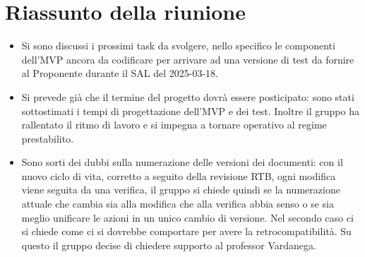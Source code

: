 \section{Riassunto della riunione}

\begin{itemize}
    \item Si sono discussi i prossimi task da svolgere, nello specifico le componenti dell'MVP ancora da codificare per arrivare ad una versione di test da fornire al Proponente durante il SAL del 2025-03-18.
    \item Si prevede già che il termine del progetto dovrà essere posticipato: sono stati sottostimati i tempi di progettazione dell'MVP e dei test. Inoltre il gruppo ha rallentato il ritmo di lavoro e si impegna a tornare operativo al regime prestabilito.
    
    \item Sono sorti dei dubbi sulla numerazione delle versioni dei documenti: con il nuovo ciclo di vita, corretto a seguito della revisione RTB, ogni modifica viene seguita da una verifica, il gruppo si chiede quindi se la numerazione attuale che cambia sia alla modifica che alla verifica abbia senso o se sia meglio unificare le azioni in un unico cambio di versione. Nel secondo caso ci si chiede come  ci si dovrebbe comportare per avere la retrocompatibilità. Su questo il gruppo decise di chiedere supporto al professor Vardanega.
    

\end{itemize}

